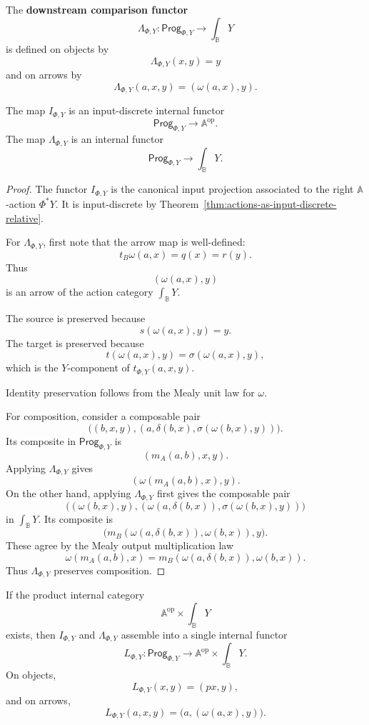\begin{definition}
\label{def:downstream-comparison-functor}
The \textbf{downstream comparison functor}
\[
\Lambda_{\Phi,Y}:\mathsf{Prog}_{\Phi,Y}\to\int_{\mathbb B}Y
\]
is defined on objects by
\[
\Lambda_{\Phi,Y}(x,y)=y
\]
and on arrows by
\[
\Lambda_{\Phi,Y}(a,x,y)=(\omega(a,x),y).
\]
\end{definition}

\begin{theorem}
\label{thm:input-and-downstream-functors}
The map \(I_{\Phi,Y}\) is an input-discrete internal functor
\[
\mathsf{Prog}_{\Phi,Y}\to\mathbb A^{\mathrm{op}}.
\]
The map \(\Lambda_{\Phi,Y}\) is an internal functor
\[
\mathsf{Prog}_{\Phi,Y}\to\int_{\mathbb B}Y.
\]
\end{theorem}

\begin{proof}
The functor \(I_{\Phi,Y}\) is the canonical input projection associated to the
right \(\mathbb A\)-action \(\Phi^\ast Y\). It is input-discrete by
Theorem~\ref{thm:actions-as-input-discrete-relative}.

For \(\Lambda_{\Phi,Y}\), first note that the arrow map is well-defined:
\[
t_B\omega(a,x)=q(x)=r(y).
\]
Thus
\[
(\omega(a,x),y)
\]
is an arrow of the action category \(\int_{\mathbb B}Y\).

The source is preserved because
\[
s(\omega(a,x),y)=y.
\]
The target is preserved because
\[
t(\omega(a,x),y)
=
\sigma(\omega(a,x),y),
\]
which is the \(Y\)-component of \(t_{\Phi,Y}(a,x,y)\).

Identity preservation follows from the Mealy unit law for \(\omega\).

For composition, consider a composable pair
\[
\bigl((b,x,y),(a,\delta(b,x),\sigma(\omega(b,x),y))\bigr).
\]
Its composite in \(\mathsf{Prog}_{\Phi,Y}\) is
\[
(m_A(a,b),x,y).
\]
Applying \(\Lambda_{\Phi,Y}\) gives
\[
(\omega(m_A(a,b),x),y).
\]
On the other hand, applying \(\Lambda_{\Phi,Y}\) first gives the composable
pair
\[
\bigl(
(\omega(b,x),y),
(\omega(a,\delta(b,x)),\sigma(\omega(b,x),y))
\bigr)
\]
in \(\int_{\mathbb B}Y\). Its composite is
\[
\bigl(
m_B(\omega(a,\delta(b,x)),\omega(b,x)),y
\bigr).
\]
These agree by the Mealy output multiplication law
\[
\omega(m_A(a,b),x)
=
m_B(\omega(a,\delta(b,x)),\omega(b,x)).
\]
Thus \(\Lambda_{\Phi,Y}\) preserves composition.
\end{proof}

\begin{corollary}
\label{cor:combined-relative-labelling}
If the product internal category
\[
\mathbb A^{\mathrm{op}}\times \int_{\mathbb B}Y
\]
exists, then \(I_{\Phi,Y}\) and \(\Lambda_{\Phi,Y}\) assemble into a single
internal functor
\[
L_{\Phi,Y}:
\mathsf{Prog}_{\Phi,Y}
\longrightarrow
\mathbb A^{\mathrm{op}}\times \int_{\mathbb B}Y.
\]
On objects,
\[
L_{\Phi,Y}(x,y)=(p x,y),
\]
and on arrows,
\[
L_{\Phi,Y}(a,x,y)=\bigl(a,(\omega(a,x),y)\bigr).
\]
\end{corollary}

